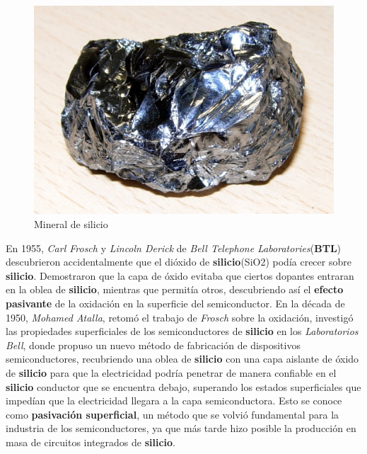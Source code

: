 \begin{figure}[htb]
	\centering
	\includegraphics[scale = 0.2]{Graphics/silicon.jpg}
	\caption{Mineral de silicio}
	\label{fig:6}
\end{figure}

En 1955, \emph{Carl Frosch} y \emph{Lincoln Derick} de \emph{Bell Telephone Laboratories}(\textbf{BTL}) descubrieron accidentalmente que el dióxido de \textbf{silicio}(SiO2)
podía crecer sobre \textbf{silicio}. Demostraron que la capa de óxido evitaba que ciertos dopantes entraran en la oblea de \textbf{silicio}, mientras que permitía otros,
descubriendo así el \textbf{efecto pasivante} de la oxidación en la superficie del semiconductor. En la década de 1950, \emph{Mohamed Atalla}, retomó el trabajo de \emph{Frosch}
sobre la oxidación, investigó las propiedades superficiales de los semiconductores de \textbf{silicio} en los \emph{Laboratorios Bell}, donde propuso un nuevo método de fabricación
de dispositivos semiconductores, recubriendo una oblea de \textbf{silicio} con una capa aislante de óxido de \textbf{silicio} para que la electricidad podría penetrar de manera
confiable en el \textbf{silicio} conductor que se encuentra debajo, superando los estados superficiales que impedían que la electricidad llegara a la capa semiconductora. Esto
se conoce como \textbf{pasivación superficial}, un método que se volvió fundamental para la industria de los semiconductores, ya que más tarde hizo posible la producción en masa de
circuitos integrados de \textbf{silicio}.
